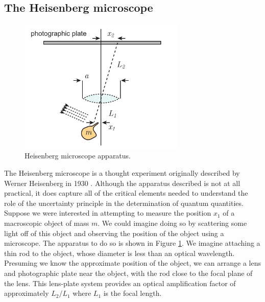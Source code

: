 \subsection{The Heisenberg microscope}

\begin{figure}
\begin{center}
	\includegraphics[width = 3.13in]{qmeas_chapter/heismicro}
\end{center}
\caption[Heisenberg microscope]{Heisenberg microscope apparatus.}
\label{fig:heismicro}
\end{figure}

The Heisenberg microscope is a thought experiment originally described by Werner Heisenberg in 1930 \cite{heisenberg1930physical}.  Although the apparatus described is not at all practical, it does capture all of the critical elements needed to understand the role of the uncertainty principle in the determination of quantum quantities.  Suppose we were interested in attempting to measure the position $x_1$ of a macroscopic object of mass $m$.  We could imagine doing so by scattering some light off of this object and observing the position of the object using a microscope.  The apparatus to do so is shown in Figure \ref{fig:heismicro}.  We imagine attaching a thin rod to the object, whose diameter is less than an optical wavelength.  Presuming we know the approximate position of the object, we can arrange a lens and photographic plate near the object, with the rod close to the focal plane of the lens.  This lens-plate system provides an optical amplification factor of approximately $L_2/L_1$ where $L_1$ is the focal length.

